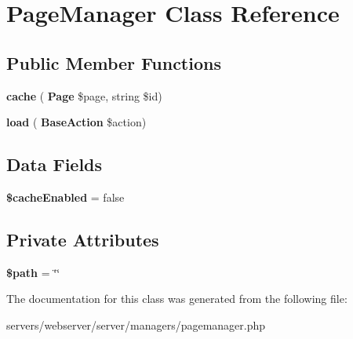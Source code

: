 \section{Page\+Manager Class Reference}
\label{class_lora_1_1_page_manager}
\subsection*{Public Member Functions}
\begin{DoxyCompactItemize}
\item 
\mbox{\label{class_lora_1_1_page_manager_ad3e2c2ddb1a0601061eadd0d48404fd0}} 
{\bfseries cache} (\textbf{ Page} \$page, string \$id)
\item 
\mbox{\label{class_lora_1_1_page_manager_a766144b3d568ea2b61e4432c62da9dee}} 
{\bfseries load} (\textbf{ Base\+Action} \$action)
\end{DoxyCompactItemize}
\subsection*{Data Fields}
\begin{DoxyCompactItemize}
\item 
\mbox{\label{class_lora_1_1_page_manager_a7741f32e8202cda9b33453211d3c18f3}} 
{\bfseries \$cache\+Enabled} = false
\end{DoxyCompactItemize}
\subsection*{Private Attributes}
\begin{DoxyCompactItemize}
\item 
\mbox{\label{class_lora_1_1_page_manager_a0a4baf0b22973c07685c3981f0d17fc4}} 
{\bfseries \$path} = \char`\"{}\char`\"{}
\end{DoxyCompactItemize}


The documentation for this class was generated from the following file\+:\begin{DoxyCompactItemize}
\item 
servers/webserver/server/managers/pagemanager.\+php\end{DoxyCompactItemize}
